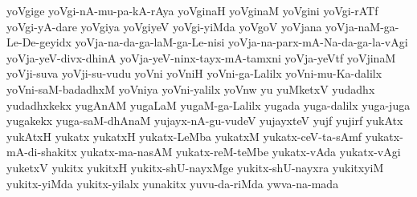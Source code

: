 {yoVgige
yoVgi-nA-mu-pa-kA-rAya
yoVginaH
yoVginaM
yoVgini
yoVgi-rATf
yoVgi-yA-dare
yoVgiya
yoVgiyeV
yoVgi-yiMda
yoVgoV
yoVjana
yoVja-naM-ga-Le-De-geyidx
yoVja-na-da-ga-laM-ga-Le-nisi
yoVja-na-parx-mA-Na-da-ga-la-vAgi
yoVja-yeV-divx-dhinA
yoVja-yeV-ninx-tayx-mA-tamxni
yoVja-yeVtf
yoVjinaM
yoVji-suva
yoVji-su-vudu
yoVni
yoVniH
yoVni-ga-Lalilx
yoVni-mu-Ka-dalilx
yoVni-saM-badadhxM
yoVniya
yoVni-yalilx
yoVnw
yu
yuMketxV
yudadhx
yudadhxkekx
yugAnAM
yugaLaM
yugaM-ga-Lalilx
yugada
yuga-dalilx
yuga-juga
yugakekx
yuga-saM-dhAnaM
yujayx-nA-gu-vudeV
yujayxteV
yujf
yujirf
yukAtx
yukAtxH
yukatx
yukatxH
yukatx-LeMba
yukatxM
yukatx-ceV-ta-sAmf
yukatx-mA-di-shakitx
yukatx-ma-nasAM
yukatx-reM-teMbe
yukatx-vAda
yukatx-vAgi
yuketxV
yukitx
yukitxH
yukitx-shU-nayxMge
yukitx-shU-nayxra
yukitxyiM
yukitx-yiMda
yukitx-yilalx
yunakitx
yuvu-da-riMda
ywva-na-mada
}

